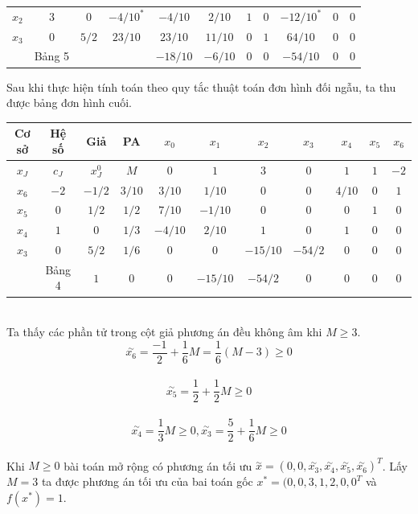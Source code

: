 \documentclass[12pt,a4paper]{report}
\begin{document}
\begin{itemize}
\begin{tabular}{|c|c|c|c|c|c|c|c|c|c|c|}
        $x_2$ &$3$ &$0$ &$-4/10^*$ &$-4/10$ &$2/10$ &$1$ &$0$ &$-12/10^*$ &$0$ &$0$\\
        $x_3$ &$0$ &$5/2$ &$23/10$ &$23/10$ &$11/10$ &$0$ &$1$ &$64/10$ &$0$ &$0$\\
        \hline
        &Bảng 5&&&$-18/10$ &$-6/10$ &$0$ &$0$ &$-54/10$ &$0$ &$0$\\
        \hline
        \end{tabular}
    Sau khi thực hiện tính toán theo quy tắc thuật toán đơn hình đối ngẫu, ta thu được bảng đơn hình cuối.\\
    \begin{tabular}{|c|c|c|c|c|c|c|c|c|c|c|}
    \hline
         Cơ sở &Hệ số &Giả &PA &$x_0$&$x_1$ & $x_2$ &$x_3$ &$x_4$ & $x_5$ &$x_6$ \\
         \hline
         $x_J$ &$c_J$& $x_J^0$ &$M$ &$0$ &$1$ &$3$ &$0$ &$1$ &$1$ &$-2$\\
         \hline
        $x_6$ & $-2$ &$-1/2$ &$3/10$ &$3/10$ &$1/10$ &$0$ &$0$ &$4/10$ &$0$ &$1$  \\
         $x_5$& $0$ &$1/2$ &$1/2$ &$7/10$ &$-1/10$ &$0$ &$0$ &$0$ &$1$ &$0$\\
         $x_4$ &$1$ &$0$ &$1/3$ &$-4/10$ &$2/10$ &$1$ &$0$ &$1$ &$0$ &$0$\\
         $x_3$ &$0$ &$5/2$ &$1/6$ &$0$ &$0$ &$-15/10$ &$-54/2$ &$0$ &$0$ &$0$ \\
         \hline
         &Bảng 4&$1$&$0$ &$0$ &$-15/10$ &$-54/2$ &$0$ &$0$ &$0$ &$0$\\
         \hline
    \end{tabular}\\

    Ta thấy các phần tử trong cột giả phương án đều không âm khi $M \ge 3$.\\
    $$\overset{\sim}{x_6}=\frac{-1}{2}+\frac{1}{6}M= \frac{1}{6}(M-3)\ge 0$$\\
    $$\overset{\sim}{x_5}=\frac{1}{2}+\frac{1}{2}M\ge 0$$\\    
    $$\overset{\sim}{x_4}=\frac{1}{3}M\ge 0, \overset{\sim}{x_3}=\frac{5}{2}+\frac{1}{6}M\ge 0$$\\
    Khi $M\ge 0$ bài toán mở rộng có phương án tối ưu $\overset{\sim}{x}=(0,0,\overset{\sim}{x_3},\overset{\sim}{x_4},\overset{\sim}{x_5}, \overset{\sim}{x_6})^T$. Lấy $M=3$ ta được phương án tối ưu của bai toán gốc $x^*=(0,0,3,1,2,0,0^T$ và $f(x^*)=1$.\\
    
\end{itemize}
\end{document}

